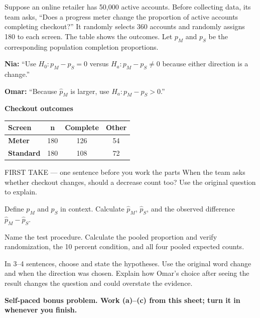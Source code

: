 \documentclass[14pt]{extarticle}
\begin{document}
\pagestyle{empty}


\noindent\begin{minipage}[t]{0.57\linewidth}
\vspace{0pt}
Suppose an online retailer has 50,000 active accounts. Before collecting data, its team asks, ``Does a progress meter change the proportion of active accounts completing checkout?'' It randomly selects 360 accounts and randomly assigns 180 to each screen. The table shows the outcomes. Let $p_M$ and $p_S$ be the corresponding population completion proportions.\par\smallskip \textbf{Nia:} ``Use $H_0:p_M-p_S=0$ versus $H_a:p_M-p_S\ne0$ because either direction is a change.''\par \textbf{Omar:} ``Because $\hat p_M$ is larger, use $H_a:p_M-p_S>0$.''\par
\end{minipage}\hfill
\begin{minipage}[t]{0.40\linewidth}
\vspace{0pt}
\begin{center}
\textbf{Checkout outcomes}\par\smallskip
\begin{tabular}{|l|c|c|c|}
\hline
\textbf{Screen} & \textbf{n} & \textbf{Complete} & \textbf{Other} \\ \hline
\textbf{Meter} & 180 & 126 & 54 \\ \hline
\textbf{Standard} & 180 & 108 & 72 \\ \hline
\end{tabular}
\end{center}
\end{minipage}

\begin{firsttakebox}{FIRST TAKE --- one sentence before you work the parts}
When the team asks whether checkout changes, should a decrease count too? Use the original question to explain.
\end{firsttakebox}

\begin{description}[leftmargin=1.15in, labelwidth=1in, itemsep=2pt, topsep=2pt]
  \item[\dokbadge{1}~(a)] Define $p_M$ and $p_S$ in context. Calculate $\hat p_M$, $\hat p_S$, and the observed difference $\hat p_M-\hat p_S$.
  \item[\dokbadge{2}~(b)] Name the test procedure. Calculate the pooled proportion and verify randomization, the 10 percent condition, and all four pooled expected counts.
  \item[\dokbadge{3}~(c)] In 3--4 sentences, choose and state the hypotheses. Use the original word change and when the direction was chosen. Explain how Omar's choice after seeing the result changes the question and could overstate the evidence.
\end{description}

\vfill
\textbf{Self-paced bonus problem. Work (a)--(c) from this sheet; turn it in whenever you finish.}
\end{document}
